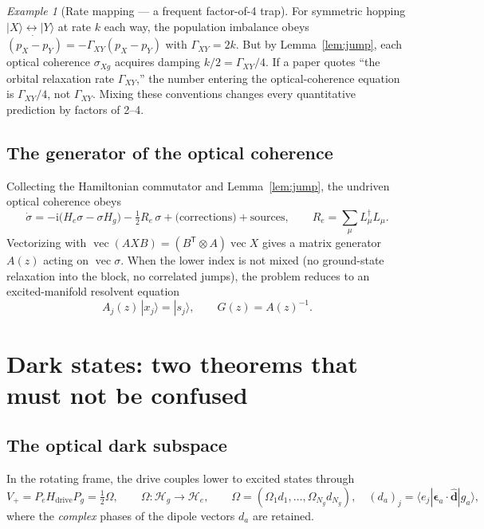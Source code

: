 \documentclass[11pt,a4paper]{article}
\theoremstyle{remark}
\newtheorem{example}[theorem]{Example}
\newcommand{\Hg}{\mathcal{H}_g}
\newcommand{\He}{\mathcal{H}_e}
\newcommand{\im}{\mathrm{i}}
\newcommand{\ket}[1]{|#1\rangle}
\newcommand{\bra}[1]{\langle #1|}
\begin{document}
\begin{example}[Rate mapping --- a frequent factor-of-4 trap]
\label{ex:rates}
For symmetric hopping $\ket{X}\leftrightarrow\ket{Y}$ at rate $k$ each way,
the population imbalance obeys
$\dot{(p_X-p_Y)}=-\Gamma_{XY}(p_X-p_Y)$ with $\Gamma_{XY}=2k$.
But by Lemma~\ref{lem:jump}, each optical coherence $\sigma_{Xg}$ acquires
damping $k/2=\Gamma_{XY}/4$. If a paper quotes ``the orbital relaxation rate
$\Gamma_{XY}$,'' the number entering the optical-coherence equation is
$\Gamma_{XY}/4$, not $\Gamma_{XY}$. Mixing these conventions changes every
quantitative prediction by factors of 2--4.
\end{example}

\subsection{The generator of the optical coherence}

Collecting the Hamiltonian commutator and Lemma~\ref{lem:jump}, the undriven
optical coherence obeys
\begin{equation}
\dot\sigma
 = -\im\bigl(H_e\sigma-\sigma H_g\bigr)
   -\tfrac12 R_e\,\sigma + \text{(corrections)} + \text{sources},
\qquad
R_e=\sum_\mu L_\mu^\dagger L_\mu .
\end{equation}
Vectorizing with $\operatorname{vec}(AXB)=(B^{\mathsf T}\!\otimes A)
\operatorname{vec}X$ gives a matrix generator $A(z)$ acting on
$\operatorname{vec}\sigma$. When the lower index is not mixed (no ground-state
relaxation into the block, no correlated jumps), the problem reduces to an
excited-manifold resolvent equation
\begin{equation}
A_j(z)\,\ket{x_j}=\ket{s_j},
\qquad G(z)=A(z)^{-1}.
\end{equation}

\section{Dark states: two theorems that must not be confused}

\subsection{The optical dark subspace}

In the rotating frame, the drive couples lower to excited states through
\begin{equation}
V_+ = P_e H_{\mathrm{drive}} P_g=\tfrac12\Omega,
\qquad
\Omega:\Hg\to\He,
\qquad
\Omega=(\Omega_1 d_1,\dots,\Omega_{N_g} d_{N_g}),
\quad (d_a)_j=\bra{e_j}\bm{\epsilon}_a\!\cdot\!\hat{\bm d}\ket{g_a},
\end{equation}
where the \emph{complex} phases of the dipole vectors $d_a$ are retained.
\end{document}
